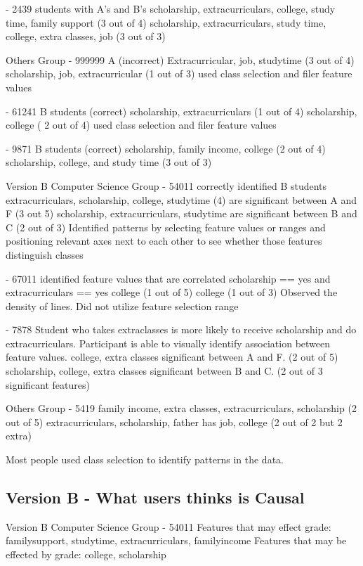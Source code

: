 - 2439
    students with A's and B's 
    scholarship, extracurriculars, college, study time, family support (3 out of 4)
    scholarship, extracurriculars, study time, college, extra classes, job (3 out of 3)
    

Others Group
- 999999 
    A (incorrect)
    Extracurricular, job, studytime (3 out of 4)
    scholarship, job, extracurricular (1 out of 3)
    used class selection and filer feature values
    
- 61241 
    B students (correct)
    scholarship, extracurriculars (1 out of 4) 
    scholarship, college ( 2 out of 4) 
    used class selection and filer feature values

- 9871
    B students (correct)
    scholarship, family income,  college (2 out of 4) 
    scholarship, college, and study time (3 out of 3)
    
Version B
Computer Science Group 
- 54011
    correctly identified B students
    extracurriculars, scholarship, college, studytime (4) are significant between A and F (3 out 5)
    scholarship, extracurriculars, studytime are significant between B and C (2 out of 3)
    Identified patterns by selecting feature values or ranges and positioning relevant axes next to each other to see whether those features distinguish classes 
    
- 67011
    identified feature values that are correlated scholarship == yes and extracurriculars == yes
    college (1 out of 5)
    college (1 out of 3)
    Observed the density of lines. Did not utilize feature selection range
    
- 7878
    Student who takes extraclasses is more likely to receive scholarship and do extracurriculars. Participant is able to visually identify association between feature values. 
    college, extra classes significant between A and F. (2 out of 5)
    scholarship, college, extra classes significant between B and C. (2 out of 3 significant features) 
    
    
Others Group
- 5419
    family income, extra classes, extracurriculars, scholarship (2 out of 5) 
    extracurriculars, scholarship, father has job, college (2 out of 2 but 2 extra)
    

    
Most people used class selection to identify patterns in the data. 

\subsection{ Version B - What users thinks is Causal}
Version B
Computer Science Group 
- 54011
    Features that may effect grade: familysupport, studytime, extracurriculars, familyincome
    Features that may be effected by grade: college, scholarship

